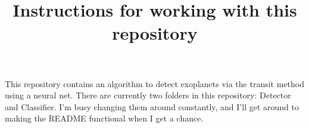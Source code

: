 \documentclass{article}
\begin{document}
\title{Instructions for working with this repository}
\maketitle
This repository contains an algorithm to detect exoplanets via the transit method using a neural net.
\newline
\indent There are currently two folders in this repository: Detector and Classifier. I'm busy changing them around constantly, and I'll get around to making the README functional when I get a chance.
\end{document}
